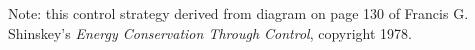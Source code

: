 \vskip 30pt

Note: this control strategy derived from diagram on page 130 of Francis G. Shinskey's {\it Energy Conservation Through Control}, copyright 1978.




